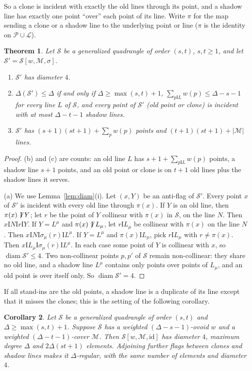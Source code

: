 \documentclass[11pt]{amsart}
\newtheorem{theorem}{Theorem}[section]
\newtheorem{corollary}[theorem]{Corollary}
\theoremstyle{definition}
\theoremstyle{remark}
\newcommand{\cS}{\mathcal{S}}
\newcommand{\cP}{\mathcal{P}}
\newcommand{\cL}{\mathcal{L}}
\newcommand{\cM}{\mathcal{M}}
\newcommand{\I}{\mathrel{\mathrm{I}}}
\newcommand{\nI}{\mathrel{\not\!\mathrm{I}}}
\newcommand{\diam}{\operatorname{diam}}
\begin{document}
So a clone is incident with exactly the old lines through its point, and a shadow line has exactly one point ``over'' each point of its line. Write $\pi$ for the map sending a clone or a shadow line to the underlying point or line ($\pi$ is the identity on $\cP\cup\cL$).

\begin{theorem}\label{thm:B}
Let $\cS$ be a generalized quadrangle of order $(s,t)$, $s,t\ge1$, and let $\cS'=\cS[w,\cM,\sigma]$.
\begin{enumerate}[label=\textup{(\alph*)}]
\item $\cS'$ has diameter $4$.
\item $\Delta(\cS')\le\Delta$ if and only if $\Delta\ge\max(s,t)+1$, $\sum_{p\I L}w(p)\le\Delta-s-1$ for every line $L$ of $\cS$, and every point of $\cS'$ \textup{(}old point or clone\textup{)} is incident with at most $\Delta-t-1$ shadow lines.
\item $\cS'$ has $(s+1)(st+1)+\sum_pw(p)$ points and $(t+1)(st+1)+|\cM|$ lines.
\end{enumerate}
\end{theorem}

\begin{proof}
(b) and (c) are counts: an old line $L$ has $s+1+\sum_{p\I L}w(p)$ points, a shadow line $s+1$ points, and an old point or clone is on $t+1$ old lines plus the shadow lines it serves.

(a) We use Lemma~\ref{lem:diam}(i). Let $(x,Y)$ be an anti-flag of $\cS'$. Every point $x$ of $\cS'$ is incident with every old line through $\pi(x)$.
If $Y$ is an old line, then $\pi(x)\nI Y$; let $r$ be the point of $Y$ collinear with $\pi(x)$ in $\cS$, on the line $N$. Then $x\I N\I r\I Y$.
If $Y=L^\mu$ and $\pi(x)\nI L_\mu$, let $r\I L_\mu$ be collinear with $\pi(x)$ on the line $N$. Then $x\I N\I\sigma_\mu(r)\I L^\mu$.
If $Y=L^\mu$ and $\pi(x)\I L_\mu$, pick $r\I L_\mu$ with $r\ne\pi(x)$. Then $x\I L_\mu\I\sigma_\mu(r)\I L^\mu$.
In each case some point of $Y$ is collinear with $x$, so $\diam\cS'\le4$. Two non-collinear points $p,p'$ of $\cS$ remain non-collinear: they share no old line, and a shadow line $L^\mu$ contains only points over points of $L_\mu$, and an old point is over itself only. So $\diam\cS'=4$.
\end{proof}

If all stand-ins are the old points, a shadow line is a duplicate of its line except that it misses the clones; this is the setting of the following corollary.

\begin{corollary}\label{cor:B1}
Let $\cS$ be a generalized quadrangle of order $(s,t)$ and $\Delta\ge\max(s,t)+1$. Suppose $\cS$ has a weighted $(\Delta-s-1)$-ovoid $w$ and a weighted $(\Delta-t-1)$-cover $\cM$. Then $\cS[w,\cM,\mathrm{id}]$ has diameter $4$, maximum degree $\Delta$ and $2\Delta(st+1)$ elements. Adjoining further flags between clones and shadow lines makes it $\Delta$-regular, with the same number of elements and diameter $4$.
\end{corollary}
\end{document}
